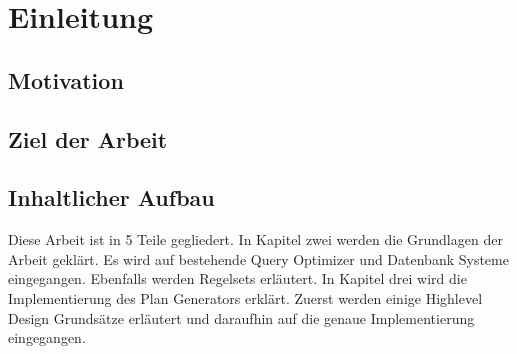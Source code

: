 \section{Einleitung}

\subsection{Motivation}

\subsection{Ziel der Arbeit}

\subsection{Inhaltlicher Aufbau}

Diese Arbeit ist in 5 Teile gegliedert. In Kapitel zwei werden die Grundlagen der Arbeit geklärt. Es wird auf bestehende Query Optimizer und Datenbank Systeme eingegangen. Ebenfalls werden Regelsets erläutert. In Kapitel drei wird die Implementierung des Plan Generators erklärt. Zuerst werden einige Highlevel Design Grundsätze erläutert und daraufhin auf die genaue Implementierung eingegangen.